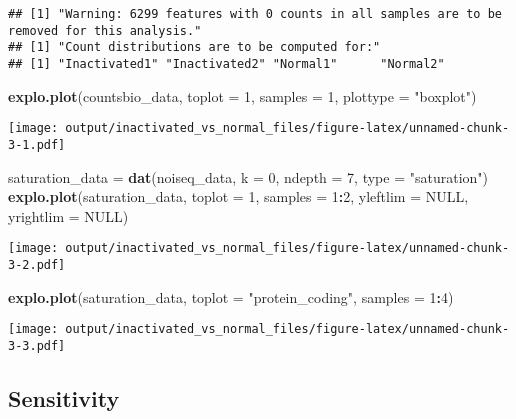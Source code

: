 \documentclass[]{article}
\newenvironment{Shaded}{\begin{snugshade}}{\end{snugshade}}
\newcommand{\KeywordTok}[1]{\textcolor[rgb]{0.13,0.29,0.53}{\textbf{#1}}}
\newcommand{\DataTypeTok}[1]{\textcolor[rgb]{0.13,0.29,0.53}{#1}}
\newcommand{\DecValTok}[1]{\textcolor[rgb]{0.00,0.00,0.81}{#1}}
\newcommand{\StringTok}[1]{\textcolor[rgb]{0.31,0.60,0.02}{#1}}
\newcommand{\OtherTok}[1]{\textcolor[rgb]{0.56,0.35,0.01}{#1}}
\newcommand{\OperatorTok}[1]{\textcolor[rgb]{0.81,0.36,0.00}{\textbf{#1}}}
\newcommand{\NormalTok}[1]{#1}
\begin{document}
\begin{verbatim}
## [1] "Warning: 6299 features with 0 counts in all samples are to be removed for this analysis."
## [1] "Count distributions are to be computed for:"
## [1] "Inactivated1" "Inactivated2" "Normal1"      "Normal2"
\end{verbatim}

\begin{Shaded}
\begin{Highlighting}[]
\KeywordTok{explo.plot}\NormalTok{(countsbio_data, }\DataTypeTok{toplot =} \DecValTok{1}\NormalTok{, }\DataTypeTok{samples =} \DecValTok{1}\NormalTok{, }\DataTypeTok{plottype =} \StringTok{"boxplot"}\NormalTok{)}
\end{Highlighting}
\end{Shaded}

\texttt{[image: output/inactivated\_vs\_normal\_files/figure-latex/unnamed-chunk-3-1.pdf]}

\begin{Shaded}
\begin{Highlighting}[]
\NormalTok{saturation_data =}\StringTok{ }\KeywordTok{dat}\NormalTok{(noiseq_data, }\DataTypeTok{k =} \DecValTok{0}\NormalTok{, }\DataTypeTok{ndepth =} \DecValTok{7}\NormalTok{, }\DataTypeTok{type =} \StringTok{"saturation"}\NormalTok{)}
\KeywordTok{explo.plot}\NormalTok{(saturation_data, }\DataTypeTok{toplot =} \DecValTok{1}\NormalTok{, }\DataTypeTok{samples =} \DecValTok{1}\OperatorTok{:}\DecValTok{2}\NormalTok{, }\DataTypeTok{yleftlim =} \OtherTok{NULL}\NormalTok{, }\DataTypeTok{yrightlim =} \OtherTok{NULL}\NormalTok{)}
\end{Highlighting}
\end{Shaded}

\texttt{[image: output/inactivated\_vs\_normal\_files/figure-latex/unnamed-chunk-3-2.pdf]}

\begin{Shaded}
\begin{Highlighting}[]
\KeywordTok{explo.plot}\NormalTok{(saturation_data, }\DataTypeTok{toplot =} \StringTok{"protein_coding"}\NormalTok{, }\DataTypeTok{samples =} \DecValTok{1}\OperatorTok{:}\DecValTok{4}\NormalTok{)}
\end{Highlighting}
\end{Shaded}

\texttt{[image: output/inactivated\_vs\_normal\_files/figure-latex/unnamed-chunk-3-3.pdf]}

\subsection{Sensitivity}\label{sensitivity}
\end{document}
